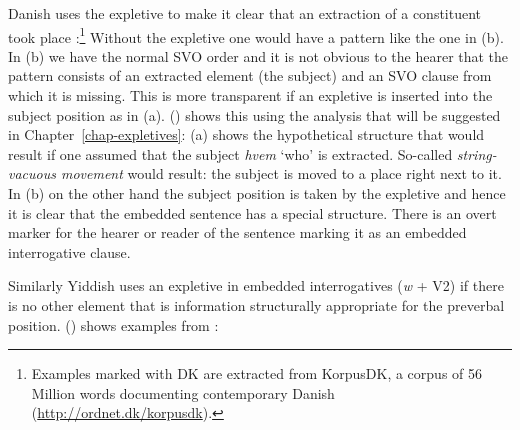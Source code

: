 Danish uses the expletive to make it clear that an extraction of a constituent took place
\citep[]{MOe2011a}:\footnote{
  Examples marked with DK are extracted from KorpusDK, a corpus of 56 Million words documenting
  contemporary Danish (\url{http://ordnet.dk/korpusdk}).
}
\eal
{}
\zl
Without the expletive one would have a pattern like the one in (b). In (b) we have the
normal SVO order and it is not obvious to the hearer that the pattern consists of an extracted
element (the subject) and an SVO clause from which it is missing. This is more transparent if an
expletive is inserted into the subject position as in (a). () shows this using the
analysis that will be suggested in Chapter~\ref{chap-expletives}: (a) shows the hypothetical
structure that would result if one assumed that the subject \emph{hvem} `who' is
extracted. So-called \emph{string-vacuous movement} would result: the subject is moved to a place
right next to it. In (b) on the other hand the subject position is taken by the expletive and
hence it is clear that the embedded sentence has a special structure. There is an overt marker for
the hearer or reader of the sentence marking it as an embedded interrogative clause.
\eal
{}
\zl

Similarly Yiddish uses an expletive in embedded interrogatives (\emph{w} + V2) if 
there is no other element that is information structurally appropriate for the preverbal position.
() shows examples from \citet[--404]{Prince89a}:

